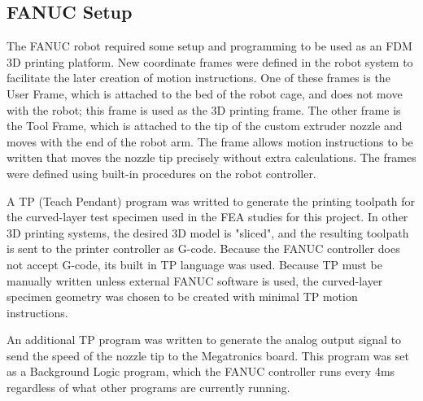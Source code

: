 \subsection*{FANUC Setup}

The FANUC robot required some setup and programming to be used as an FDM 3D printing platform. New coordinate frames were defined in the robot system to facilitate the later creation of motion instructions. One of these frames is the User Frame, which is attached to the bed of the robot cage, and does not move with the robot; this frame is used as the 3D printing frame. The other frame is the Tool Frame, which is attached to the tip of the custom extruder nozzle and moves with the end of the robot arm. The frame allows motion instructions to be written that moves the nozzle tip precisely without extra calculations. The frames were defined using built-in procedures on the robot controller.

A TP (Teach Pendant) program was writted to generate the printing toolpath for the curved-layer test specimen used in the FEA studies for this project. In other 3D printing systems, the desired 3D model is "sliced", and the resulting toolpath is sent to the printer controller as G-code. Because the FANUC controller does not accept G-code, its built in TP language was used. Because TP must be manually written unless external FANUC software is used, the curved-layer specimen geometry was chosen to be created with minimal TP motion instructions. 

An additional TP program was written to generate the analog output signal to send the speed of the nozzle tip to the Megatronics board. This program was set as a Background Logic program, which the FANUC controller runs every 4ms regardless of what other programs are currently running. 

